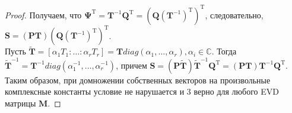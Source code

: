 \documentclass[specialist,
               substylefile = spbu_report.rtx,
               subf,href,colorlinks=true, 12pt]{disser}
\theoremstyle{definition}
\begin{document}
\begin{proof}
Получаем, что $\mathbf{\Psi}^{\mathrm{T}} = \mathbf{T}^{-1}\mathbf{Q}^{\mathrm{T}} = (\mathbf{Q}(\mathbf{T}^{-1})^{\mathrm{T}})^{\mathrm{T}}$, следовательно, $\mathbf{S} = (\mathbf{PT})(\mathbf{Q}(\mathbf{T}^{-1})^{\mathrm{T}})^{\mathrm{T}}$. \\
\hspace*{0.5cm} Пусть $\widetilde{\mathbf{T}} = [\alpha_1T_1: \dots :\alpha_rT_r] = \mathbf{T}diag(\alpha_1, \dots ,\alpha_r), \alpha_i \in \mathbb{C}$. Тогда $\widetilde{\mathbf{T}}^{-1} = \mathbf{T}^{-1}diag(\alpha_1^{-1}, \dots ,\alpha_r^{-1})$, причем $\mathbf{S} = (\mathbf{P}\widetilde{\mathbf{T}})\widetilde{\mathbf{T}}^{-1}\mathbf{Q}^{\mathrm{T}} = (\mathbf{P}\mathbf{T})\mathbf{T}^{-1}\mathbf{Q}^{\mathrm{T}}$. Таким образом, при домножении собственных векторов
на произвольные комплексные константы условие не нарушается и 3
верно для любого EVD матрицы $\mathbf{M}$.
\end{proof}
\end{document}

